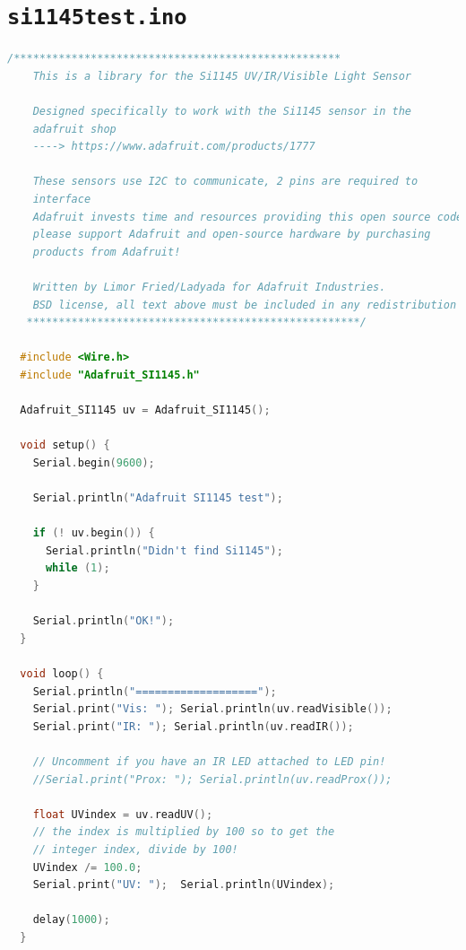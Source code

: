 \documentclass[12pt,openany,a4paper]{book}
\begin{document}
\section{\texttt{si1145test.ino}}
\label{code:si1145test}

\begin{lstlisting}[basicstyle=\ttfamily,breaklines=true,language=c++]
	/*************************************************** 
	This is a library for the Si1145 UV/IR/Visible Light Sensor
  
	Designed specifically to work with the Si1145 sensor in the
	adafruit shop
	----> https://www.adafruit.com/products/1777
  
	These sensors use I2C to communicate, 2 pins are required to  
	interface
	Adafruit invests time and resources providing this open source code, 
	please support Adafruit and open-source hardware by purchasing 
	products from Adafruit!
  
	Written by Limor Fried/Ladyada for Adafruit Industries.  
	BSD license, all text above must be included in any redistribution
   ****************************************************/
  
  #include <Wire.h>
  #include "Adafruit_SI1145.h"
  
  Adafruit_SI1145 uv = Adafruit_SI1145();
  
  void setup() {
	Serial.begin(9600);
	
	Serial.println("Adafruit SI1145 test");
	
	if (! uv.begin()) {
	  Serial.println("Didn't find Si1145");
	  while (1);
	}
  
	Serial.println("OK!");
  }
  
  void loop() {
	Serial.println("===================");
	Serial.print("Vis: "); Serial.println(uv.readVisible());
	Serial.print("IR: "); Serial.println(uv.readIR());
	
	// Uncomment if you have an IR LED attached to LED pin!
	//Serial.print("Prox: "); Serial.println(uv.readProx());
  
	float UVindex = uv.readUV();
	// the index is multiplied by 100 so to get the
	// integer index, divide by 100!
	UVindex /= 100.0;  
	Serial.print("UV: ");  Serial.println(UVindex);
  
	delay(1000);
  }
\end{lstlisting}
\end{document}
